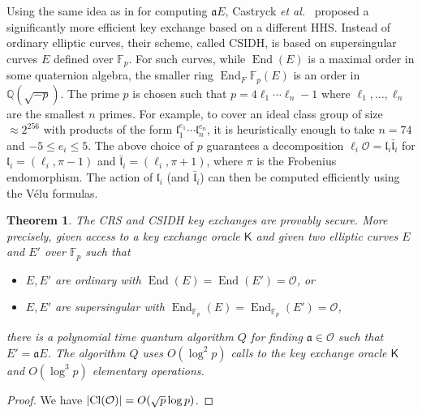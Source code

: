 \documentclass[11pt]{article}
\theoremstyle{plain}
\newtheorem{theorem}{Theorem}[section]
\theoremstyle{definition}
\DeclareMathOperator{\groupofend}{End} %
\DeclarePairedDelimiter{\abs}{\lvert}{\rvert}
\def\Q{\mathbb{Q}}
\def\F{\mathbb{F}}
\newcommand{\kex}{\mathsf{K}}
\renewcommand{\O}{\mathcal{O}}
\newcommand{\clo}{\text{Cl}(\mathcal{O})}
\begin{document}
Using the same idea as in \cite{de2018towards} for computing $\mathfrak{a} E$, Castryck \textit{et 
al.}~\cite{castryck2018csidh} proposed a significantly more efficient key exchange based on a 
different HHS. Instead of ordinary elliptic curves, their scheme, called CSIDH, is based on
supersingular curves $E$ defined over $\F_p$. For such curves, while $\groupofend(E)$ is a maximal 
order in some quaternion algebra, the smaller ring $\groupofend_F{\F_p}(E)$ is an order in 
$\Q(\sqrt{-p})$. The prime $p$ is chosen such that $p = 4 \ell_1 \cdots \ell_n - 1$ where $\ell_1, 
\dots, \ell_n$ are the smallest $n$ primes. For example, to cover an ideal class group of size 
$\approx 2^{256}$ with products of the form $\mathfrak{l}_1^{e_1} \cdots \mathfrak{l}_n^{e_n}$, it 
is heuristically enough to take $n = 74$ and $-5 \le e_i \le 5$. The above choice of $p$ guarantees 
a decomposition $\ell_i \O = \mathfrak{l}_i \bar{\mathfrak{l}}_i$ for $\mathfrak{l}_i = (\ell_i, \pi 
- 1)$ and $\bar{\mathfrak{l}}_i = (\ell_i, \pi + 1)$, where $\pi$ is the Frobenius endomorphism. The 
action of $\mathfrak{l}_i$ (and $\bar{\mathfrak{l}}_i$) can then be computed efficiently using the 
V\'elu formulas.

\begin{theorem}
	The CRS and CSIDH key exchanges are provably secure. More precisely, given access to a key 
	exchange oracle $\kex$ and given two elliptic curves $E$ and $E'$ over $\F_p$ such that
	\begin{itemize}[topsep = 0pt, itemsep = 0pt, parsep = 0pt]
		\item $E, E'$ are ordinary with $\groupofend(E) = \groupofend(E') = \O$, or
		\item $E, E'$ are supersingular with $\groupofend_{\F_p}(E) = \groupofend_{\F_p}(E') = \O$,
	\end{itemize}
	there is a polynomial time quantum algorithm $Q$ for finding $\mathfrak{a} \in 
	\O$ such that $E' = \mathfrak{a} E$. The algorithm $Q$ uses $O(\log^2 p)$ calls to the 
	key exchange oracle $\kex$ and $O(\log^3 p)$ elementary operations.
\end{theorem}
\begin{proof}
    We have $\abs{\clo} = O(\sqrt{p} \log p)$.
\end{proof}








\newpage


\end{document}
